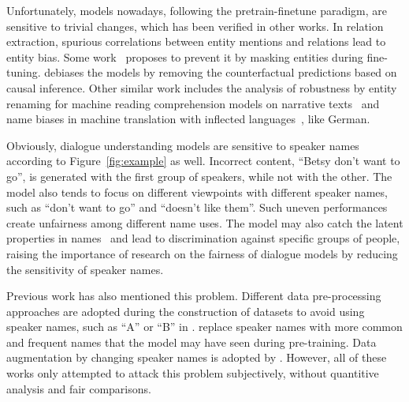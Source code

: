Unfortunately, models nowadays, following the pretrain-finetune paradigm, 
are sensitive to trivial changes, which has been verified in other works. 
In relation extraction, spurious correlations between entity mentions and 
relations lead to entity bias. 
Some work~\cite{zhang2018graph,zhang-etal-2017-position} proposes to 
prevent it by masking entities during fine-tuning. 
\citet{wang-etal-2022-rely} debiases the models by removing the 
counterfactual predictions based on causal inference. 
Other similar work includes the analysis of robustness by entity 
renaming for machine reading comprehension models on narrative 
texts~\cite{yan2022robustness} and name biases in machine translation 
with inflected languages~\cite{wang2022measuring}, like German. 


Obviously, dialogue understanding models are sensitive to speaker names 
according to Figure~\ref{fig:example} as well. Incorrect content, 
``Betsy don't want to go'', is generated with the first group of speakers, 
while not with the other. The model also tends to focus on different viewpoints 
with different speaker names, such as ``don't want to go'' and 
``doesn't like them''.  Such uneven performances create unfairness among 
different name uses. The model may also catch the latent properties 
in names~\cite{romanov2019s} and lead to discrimination against 
specific groups of people, raising the importance of research on the fairness of dialogue models by reducing the sensitivity of speaker names.


Previous work has also mentioned this problem. Different data pre-processing approaches are adopted during the construction of datasets to avoid using speaker names, such as ``A'' or ``B'' in \citet{li2017dailydialog}. \citet{khalifa2021bag} replace speaker names with more common and frequent names that the model may have seen during pre-training. Data augmentation by changing speaker names is adopted by \citet{liu2021controllable}.
However, all of these works only attempted to attack this problem 
subjectively, without quantitive analysis and fair comparisons.

